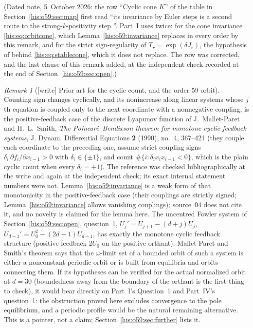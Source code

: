 \documentclass[11pt]{article}
\theoremstyle{remark}\newtheorem{remark}[theorem]{Remark}
\numberwithin{equation}{section}
\begin{document}
\noindent(Dated note, 5~October 2026: the row ``Cyclic cone $K$'' of the table in Section~\ref{his:o59:sec:map} first read ``its invariance by Euler steps is a second route to the strong-$k$-positivity step \cite{weiss2021}''. Part~I uses \cite{weiss2021} twice: for the cone invariance \eqref{his:eq:orbitcone}, which Lemma~\ref{his:o59:invariance} replaces in every order by this remark, and for the strict sign-regularity of $T_r=\exp(\delta J_r)$, the hypothesis of \cite{alseidi2019} behind \eqref{his:eq:stablecone}, which it does not replace. The row was corrected, and the last clause of this remark added, at the independent check recorded at the end of Section~\ref{his:o59:sec:open}.)
\begin{remark}[\textsf{[write]} Prior art for the cyclic count, and the order-59 orbit]\label{his:o59:rem:mps}
Counting sign changes cyclically, and its nonincrease along linear systems whose $j$th equation is coupled only to the next coordinate with a nonnegative coupling, is the positive-feedback case of the discrete Lyapunov function of J.~Mallet-Paret and H.~L.~Smith, \emph{The Poincar\'e--Bendixson theorem for monotone cyclic feedback systems}, J. Dynam. Differential Equations \textbf{2} (1990), no.~4, 367--421 (they couple each coordinate to the preceding one, assume strict coupling signs $\delta_i\,\partial f_i/\partial x_{i-1}>0$ with $\delta_i\in\{\pm1\}$, and count $\#\{i:\delta_ix_ix_{i-1}<0\}$, which is the plain cyclic count when every $\delta_i=+1$). The reference was checked bibliographically at the write and again at the independent check; its exact internal statement numbers were not. Lemma~\ref{his:o59:invariance} is a weak form of that monotonicity in the positive-feedback case (their couplings are strictly signed; Lemma~\ref{his:o59:invariance} allows vanishing couplings); source~04 does not cite it, and no novelty is claimed for the lemma here. The uncentred Fowler system of Section~\ref{his:o59:sec:open}, question~1, $U_j'=U_{j+1}-(d+j)U_j$, $U_{d-1}'=U_0^2-(2d-1)U_{d-1}$, has exactly the monotone cyclic feedback structure (positive feedback $2U_0$ on the positive orthant). Mallet-Paret and Smith's theorem says that the $\omega$-limit set of a bounded orbit of such a system is either a nonconstant periodic orbit or is built from equilibria and orbits connecting them. If its hypotheses can be verified for the actual normalized orbit at $d=30$ (boundedness away from the boundary of the orthant is the first thing to check), it would bear directly on Part~I's Question~1 and Part~IV's question~1: the obstruction proved here excludes convergence to the pole equilibrium, and a periodic profile would be the natural remaining alternative. This is a pointer, not a claim; Section~\ref{his:o59:sec:further} lists it.
\end{remark}
\end{document}

